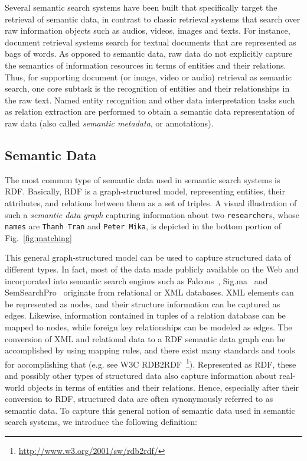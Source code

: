 Several semantic search systems have been built that specifically target the retrieval of semantic data,  in contrast to classic retrieval systems that search over raw information objects such as audios, videos, images and texts. For instance, document retrieval systems search for textual documents that are represented as bags of words. As opposed to semantic data, raw data do not explicitly capture the semantics of information resources in terms of entities and their relations. Thus, for supporting document (or image, video or audio) retrieval as semantic search, one core subtask is the recognition of entities and their relationships in the raw text. Named entity recognition and other data interpretation tasks such as relation extraction are performed to obtain a semantic data representation of raw data (also called \emph{semantic metadata}, or annotations). 


\subsection{Semantic Data}  The most common type of semantic data used in semantic search systems is RDF. Basically, RDF is a graph-structured model, representing entities, their attributes, and relations between them as a set of triples. A visual illustration of such a \emph{semantic data graph} capturing information about two \verb+researcher+s, whose \verb+names+ are \verb+Thanh Tran+ and \verb+Peter Mika+, is depicted in the bottom portion of Fig.~\ref{fig:matching} 

This general graph-structured model can be used to capture structured data of different types. In fact, most of the data made publicly available on the Web and incorporated into semantic search engines such as Falcons~\cite{DBLP:journals/ijswis/ChengQ09}, Sig.ma~\cite{DBLP:journals/ws/TummarelloCCDDD10} and SemSearchPro~\cite{DBLP:journals/ws/TranHL11} originate from relational or XML databases. XML elements can be represented as nodes, and their structure information can be captured as edges. Likewise, information contained in tuples of a relation database can be mapped to nodes, while foreign key relationships can be modeled as edges. The conversion of XML and relational data to a RDF semantic data graph can be accomplished by using mapping rules, and there exist many standards and tools for accomplishing that (e.g. see W3C RDB2RDF~\footnote{\url{http://www.w3.org/2001/sw/rdb2rdf/}}). Represented as RDF, these and possibly other types of structured data also capture information about real-world objects in terms of entities and their relations. Hence, especially after their conversion to RDF, structured data are often synonymously referred to as semantic data. To capture this general notion of semantic data used in semantic search systems, we introduce the following definition: 

